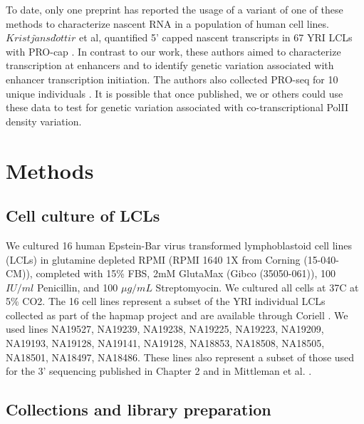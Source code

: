 To date, only one preprint has reported the usage of a variant of one of these methods to characterize nascent RNA in a population of human cell lines. $Kristj\grave{a}nsd\grave{o}ttir$ et al, quantified 5' capped nascent transcripts in 67 YRI LCLs with PRO-cap \citep{kristjansdottir_population-scale_2018}. In contrast to our work, these authors aimed to characterize transcription at enhancers and to identify genetic variation associated with enhancer transcription initiation. The authors also collected PRO-seq for 10 unique individuals \citep{kristjansdottir_population-scale_2018}. It is possible that once published, we or others could use these data to test for genetic variation associated with co-transcriptional PolII density variation. 


\section{Methods}\label{ch04-methods}



\subsection{Cell culture of LCLs}\label{cell-culture-of-LCLs} 

We cultured 16 human Epstein-Bar virus transformed lymphoblastoid cell lines (LCLs) in glutamine depleted RPMI (RPMI 1640 1X from Corning (15-040-CM)), completed with 15\% FBS, 2mM GlutaMax (Gibco (35050-061)), 100 $IU/ml$ Penicillin, and 100 $\mu g/mL$ Streptomyocin. We cultured all cells at 37C at 5\% CO2. The 16 cell lines represent a subset of the YRI individual LCLs collected as part of the hapmap project and are available through Coriell \citep{HapMap2005}. 
We used lines NA19527, NA19239, NA19238, NA19225, NA19223, NA19209, NA19193, NA19128, NA19141, NA19128, NA18853, NA18508, NA18505, NA18501, NA18497, NA18486. These lines also represent a subset of those used for the 3' sequencing published in Chapter 2 and in Mittleman et al. \citep{mittleman_alternative_2020}. 


\subsection{Collections and library preparation}\label{Collections-and-library-preparation}

